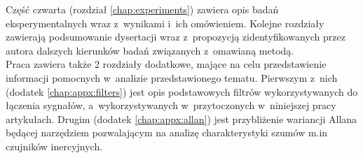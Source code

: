 Część czwarta (rozdział \ref{chap:experiments}) zawiera opis badań eksperymentalnych wraz z~wynikami i~ich omówieniem. Kolejne rozdziały zawierają podsumowanie dysertacji wraz z~propozycją zidentyfikowanych przez autora dalszych kierunków badań związanych z~omawianą metodą.\\

Praca zawiera także 2 rozdziały dodatkowe, mające na celu przedstawienie informacji pomocnych w~analizie przedstawionego tematu. Pierwszym z~nich (dodatek \ref{chap:appx:filters}) jest opis podstawowych filtrów wykorzystywanych do łączenia sygnałów, a~wykorzystywanych w~przytoczonych w~niniejszej pracy artykułach. Drugim (dodatek \ref{chap:appx:allan}) jest przybliżenie wariancji Allana będącej narzędziem pozwalającym na analizę charakterystyki szumów m.in czujników inercyjnych.